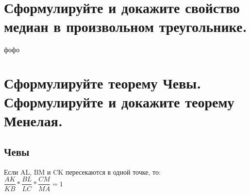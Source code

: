 \documentclass[12pt, letterpaper]{article}
\begin{document}
\section {Сформулируйте и докажите свойство медиан в произвольном треугольнике.}
фофо

\section {Сформулируйте теорему Чевы. Сформулируйте и докажите теорему Менелая.}
\subsection{Чевы}
Если AL, BM и CK пересекаются в одной точке, то: \\
$\dfrac{AK}{KB}*\dfrac{BL}{LC}*\dfrac{CM}{MA}=1$\\
\end{document}
